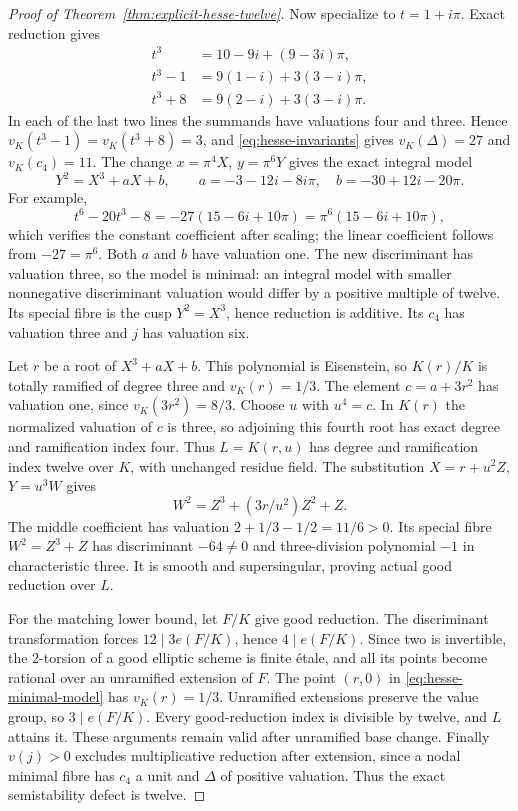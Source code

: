 \begin{proof}[Proof of Theorem~\ref{thm:explicit-hesse-twelve}]
Now specialize to $t=1+i\pi$. Exact reduction gives
\begin{align*}
 t^3&=10-9i+(9-3i)\pi,\\
 t^3-1&=9(1-i)+3(3-i)\pi,\\
 t^3+8&=9(2-i)+3(3-i)\pi.
\end{align*}
In each of the last two lines the summands have valuations four and three. Hence $v_K(t^3-1)=v_K(t^3+8)=3$, and \eqref{eq:hesse-invariants} gives $v_K(\Delta)=27$ and $v_K(c_4)=11$.
The change $x=\pi^4X$, $y=\pi^6Y$ gives the exact integral model
\begin{equation}\label{eq:hesse-minimal-model}
 Y^2=X^3+aX+b,\qquad
 a=-3-12i-8i\pi,\quad b=-30+12i-20\pi.
\end{equation}
For example,
\[
 t^6-20t^3-8=-27(15-6i+10\pi)=\pi^6(15-6i+10\pi),
\]
which verifies the constant coefficient after scaling; the linear coefficient follows from $-27=\pi^6$. Both $a$ and $b$ have valuation one. The new discriminant has valuation three, so the model is minimal: an integral model with smaller nonnegative discriminant valuation would differ by a positive multiple of twelve. Its special fibre is the cusp $Y^2=X^3$, hence reduction is additive. Its $c_4$ has valuation three and $j$ has valuation six.

Let $r$ be a root of $X^3+aX+b$. This polynomial is Eisenstein, so $K(r)/K$ is totally ramified of degree three and $v_K(r)=1/3$. The element $c=a+3r^2$ has valuation one, since $v_K(3r^2)=8/3$. Choose $u$ with $u^4=c$. In $K(r)$ the normalized valuation of $c$ is three, so adjoining this fourth root has exact degree and ramification index four. Thus $L=K(r,u)$ has degree and ramification index twelve over $K$, with unchanged residue field.
The substitution $X=r+u^2Z$, $Y=u^3W$ gives
\[
                     W^2=Z^3+(3r/u^2)Z^2+Z.
\]
The middle coefficient has valuation $2+1/3-1/2=11/6>0$. Its special fibre $W^2=Z^3+Z$ has discriminant $-64\ne0$ and three-division polynomial $-1$ in characteristic three. It is smooth and supersingular, proving actual good reduction over $L$.

For the matching lower bound, let $F/K$ give good reduction. The discriminant transformation forces $12\mid3e(F/K)$, hence $4\mid e(F/K)$. Since two is invertible, the $2$-torsion of a good elliptic scheme is finite \'etale, and all its points become rational over an unramified extension of $F$. The point $(r,0)$ in \eqref{eq:hesse-minimal-model} has $v_K(r)=1/3$. Unramified extensions preserve the value group, so $3\mid e(F/K)$. Every good-reduction index is divisible by twelve, and $L$ attains it. These arguments remain valid after unramified base change. Finally $v(j)>0$ excludes multiplicative reduction after extension, since a nodal minimal fibre has $c_4$ a unit and $\Delta$ of positive valuation. Thus the exact semistability defect is twelve.
\end{proof}

